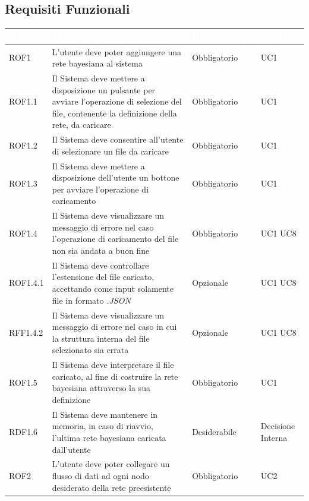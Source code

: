 \newpage
\subsection{Requisiti Funzionali}\label{RF}
\begin{center}
\begin{longtable}[c]{|m{}|m{}|m{}|m{}|}
\hline
\rowcolor{bluelogo}\textbf{\textcolor{white}{ID}} & \textbf{\textcolor{white}{Descrizione}} & \textbf{\textcolor{white}{Obbligatorietà}} & \textbf{\textcolor{white}{Fonti}}\\
\hline \hline
\endhead
ROF1 & L'utente deve poter aggiungere una rete bayesiana al sistema & Obbligatorio & UC1\\
\hline
\rowcolor{grigio}ROF1.1 & Il Sistema deve mettere a disposizione un pulsante per avviare l'operazione di selezione del file, contenente la definizione della rete, da caricare & Obbligatorio & UC1\\
\hline
ROF1.2 & Il Sistema deve consentire all'utente di selezionare un file da caricare & Obbligatorio & UC1\\
\hline
\rowcolor{grigio}ROF1.3 & Il Sistema deve mettere a disposizione dell'utente un bottone per avviare l'operazione di caricamento & Obbligatorio & UC1\\
\hline
ROF1.4 & Il Sistema deve visualizzare un messaggio di errore nel caso l'operazione di caricamento del file non sia andata a buon fine & Obbligatorio & UC1 UC8\\
\hline
\rowcolor{grigio}ROF1.4.1 & Il Sistema deve controllare l'estensione del file caricato, accettando come input solamente file in formato \textit{.JSON} & Opzionale & UC1 UC8\\
\hline
RFF1.4.2 & Il Sistema deve visualizzare un messaggio di errore nel caso in cui la struttura interna del file selezionato sia errata & Opzionale & UC1 UC8\\
\hline
\rowcolor{grigio}ROF1.5 & Il Sistema deve interpretare il file caricato, al fine di costruire la rete bayesiana attraverso la sua definizione & Obbligatorio & UC1\\
\hline
RDF1.6 & Il Sistema deve mantenere in memoria, in caso di riavvio, l'ultima rete bayesiana caricata dall'utente & Desiderabile & Decisione Interna\\
\hline
\rowcolor{grigio}ROF2 & L'utente deve poter collegare un flusso di dati ad ogni nodo desiderato della rete preesistente & Obbligatorio & UC2\\

\end{longtable}
\end{center}
